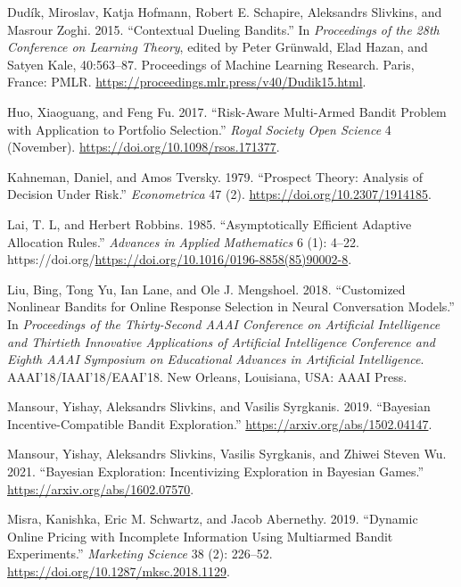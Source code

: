 \documentclass[
  letterpaper,
  DIV=11,
  numbers=noendperiod,
  oneside]{scrreprt}
\newlength{\cslhangindent}
\newenvironment{CSLReferences}[2] %
 {\begin{list}{}{%
  \setlength{\itemindent}{0pt}
  \setlength{\leftmargin}{0pt}
  \setlength{\parsep}{0pt}
  \ifodd #1
   \setlength{\leftmargin}{\cslhangindent}
   \setlength{\itemindent}{-1\cslhangindent}
  \fi
  \setlength{\itemsep}{#2\baselineskip}}}
 {\end{list}}
\theoremstyle{remark}
\begin{document}
\begin{CSLReferences}{1}{0}
Dudík, Miroslav, Katja Hofmann, Robert E. Schapire, Aleksandrs Slivkins,
and Masrour Zoghi. 2015. {``Contextual Dueling Bandits.''} In
\emph{Proceedings of the 28th Conference on Learning Theory}, edited by
Peter Grünwald, Elad Hazan, and Satyen Kale, 40:563--87. Proceedings of
Machine Learning Research. Paris, France: PMLR.
\url{https://proceedings.mlr.press/v40/Dudik15.html}.

Huo, Xiaoguang, and Feng Fu. 2017. {``Risk-Aware Multi-Armed Bandit
Problem with Application to Portfolio Selection.''} \emph{Royal Society
Open Science} 4 (November). \url{https://doi.org/10.1098/rsos.171377}.

Kahneman, Daniel, and Amos Tversky. 1979. {``Prospect Theory: Analysis
of Decision Under Risk.''} \emph{Econometrica} 47 (2).
\url{https://doi.org/10.2307/1914185}.

Lai, T. L, and Herbert Robbins. 1985. {``Asymptotically Efficient
Adaptive Allocation Rules.''} \emph{Advances in Applied Mathematics} 6
(1): 4--22.
https://doi.org/\url{https://doi.org/10.1016/0196-8858(85)90002-8}.

Liu, Bing, Tong Yu, Ian Lane, and Ole J. Mengshoel. 2018. {``Customized
Nonlinear Bandits for Online Response Selection in Neural Conversation
Models.''} In \emph{Proceedings of the Thirty-Second AAAI Conference on
Artificial Intelligence and Thirtieth Innovative Applications of
Artificial Intelligence Conference and Eighth AAAI Symposium on
Educational Advances in Artificial Intelligence}.
AAAI'18/IAAI'18/EAAI'18. New Orleans, Louisiana, USA: AAAI Press.

Mansour, Yishay, Aleksandrs Slivkins, and Vasilis Syrgkanis. 2019.
{``Bayesian Incentive-Compatible Bandit Exploration.''}
\url{https://arxiv.org/abs/1502.04147}.

Mansour, Yishay, Aleksandrs Slivkins, Vasilis Syrgkanis, and Zhiwei
Steven Wu. 2021. {``Bayesian Exploration: Incentivizing Exploration in
Bayesian Games.''} \url{https://arxiv.org/abs/1602.07570}.

Misra, Kanishka, Eric M. Schwartz, and Jacob Abernethy. 2019. {``Dynamic
Online Pricing with Incomplete Information Using Multiarmed Bandit
Experiments.''} \emph{Marketing Science} 38 (2): 226--52.
\url{https://doi.org/10.1287/mksc.2018.1129}.


\end{CSLReferences}
\end{document}
